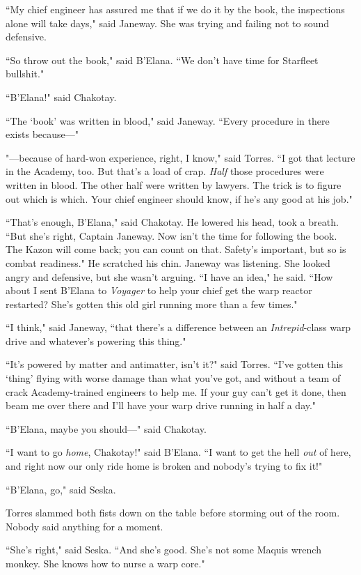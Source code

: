 \documentclass[twoside,letterpaper,12pt]{memoir}
\begin{document}
``My chief engineer has assured me that if we do it by the book, the inspections alone will take days," said Janeway. She was trying and failing not to sound defensive.

``So throw out the book," said B'Elana. ``We don't have time for Starfleet bullshit."

``B'Elana!" said Chakotay.

``The `book' was written in blood," said Janeway. ``Every procedure in there exists because---"

"---because of hard-won experience, right, I know," said Torres. ``I got that lecture in the Academy, too. But that's a load of crap. \textit{Half} those procedures were written in blood. The other half were written by lawyers. The trick is to figure out which is which. Your chief engineer should know, if he’s any good at his job."

``That's enough, B'Elana," said Chakotay. He lowered his head, took a breath. ``But she's right, Captain Janeway. Now isn't the time for following the book. The Kazon will come back; you can count on that. Safety's important, but so is combat readiness." He scratched his chin. Janeway was listening. She looked angry and defensive, but she wasn't arguing. ``I have an idea," he said. ``How about I sent B'Elana to \textit{Voyager} to help your chief get the warp reactor restarted? She's gotten this old girl running more than a few times."

``I think," said Janeway, ``that there's a difference between an \textit{Intrepid}-class warp drive and whatever's powering this thing."

``It's powered by matter and antimatter, isn't it?" said Torres. ``I've gotten this `thing' flying with worse damage than what you've got, and without a team of crack Academy-trained engineers to help me. If your guy can't get it done, then beam me over there and I'll have your warp drive running in half a day."

``B'Elana, maybe you should---" said Chakotay.

``I want to go \textit{home}, Chakotay!" said B'Elana. ``I want to get the hell \textit{out} of here, and right now our only ride home is broken and nobody's trying to fix it!"

``B'Elana, go," said Seska.

Torres slammed both fists down on the table before storming out of the room. Nobody said anything for a moment.

``She's right," said Seska. ``And she's good. She's not some Maquis wrench monkey. She knows how to nurse a warp core."
\end{document}
